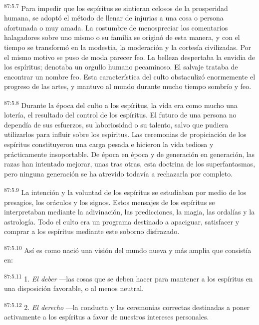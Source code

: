 \par
\textsuperscript{87:5.7} Para impedir que los espíritus se sintieran celosos de la prosperidad humana, se adoptó el método de llenar de injurias a una cosa o persona afortunada o muy amada. La costumbre de menospreciar los comentarios halagadores sobre uno mismo o su familia se originó de esta manera, y con el tiempo se transformó en la modestia, la moderación y la cortesía civilizadas. Por el mismo motivo se puso de moda parecer feo. La belleza despertaba la envidia de los espíritus; denotaba un orgullo humano pecaminoso. El salvaje trataba de encontrar un nombre feo. Esta característica del culto obstaculizó enormemente el progreso de las artes, y mantuvo al mundo durante mucho tiempo sombrío y feo.

\par
\textsuperscript{87:5.8} Durante la época del culto a los espíritus, la vida era como mucho una lotería, el resultado del control de los espíritus. El futuro de una persona no dependía de sus esfuerzos, su laboriosidad o su talento, salvo que pudiera utilizarlos para influir sobre los espíritus. Las ceremonias de propiciación de los espíritus constituyeron una carga pesada e hicieron la vida tediosa y prácticamente insoportable. De época en época y de generación en generación, las razas han intentado mejorar, unas tras otras, esta doctrina de los superfantasmas, pero ninguna generación se ha atrevido todavía a rechazarla por completo.

\par
\textsuperscript{87:5.9} La intención y la voluntad de los espíritus se estudiaban por medio de los presagios, los oráculos y los signos. Estos mensajes de los espíritus se interpretaban mediante la adivinación, las predicciones, la magia, las ordalías y la astrología. Todo el culto era un programa destinado a apaciguar, satisfacer y comprar a los espíritus mediante este soborno disfrazado.

\par
\textsuperscript{87:5.10} Así es como nació una visión del mundo nueva y más amplia que consistía en:

\par
\textsuperscript{87:5.11} 1. \textit{El deber} ---las cosas que se deben hacer para mantener a los espíritus en una disposición favorable, o al menos neutral.

\par
\textsuperscript{87:5.12} 2. \textit{El derecho} ---la conducta y las ceremonias correctas destinadas a poner activamente a los espíritus a favor de nuestros intereses personales.

